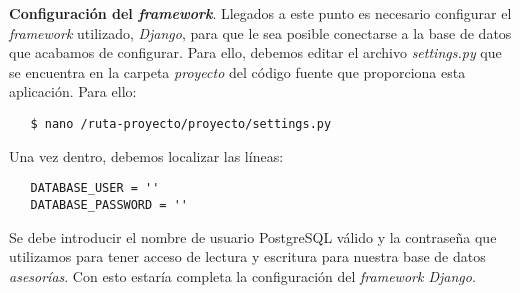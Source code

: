 \item \textbf{Configuración del \textit{framework}}.
   Llegados a este punto es necesario configurar el \textit{framework}
   utilizado, \textit{Django}, para que le sea posible conectarse a la base de
   datos que acabamos de configurar. Para ello, debemos editar el archivo
   \textit{settings.py} que se encuentra en la carpeta \textit{proyecto} del
   código fuente que proporciona esta aplicación. Para ello:

   \begin{verbatim}
   $ nano /ruta-proyecto/proyecto/settings.py
   \end{verbatim}

   Una vez dentro, debemos localizar las líneas:

   \begin{verbatim}
   DATABASE_USER = ''
   DATABASE_PASSWORD = ''
   \end{verbatim}

   Se debe introducir el nombre de usuario PostgreSQL válido y la contraseña
   que utilizamos para tener acceso de lectura y escritura para nuestra base
   de datos \textit{asesorías}. Con esto estaría completa la configuración
   del \textit{framework Django}.
